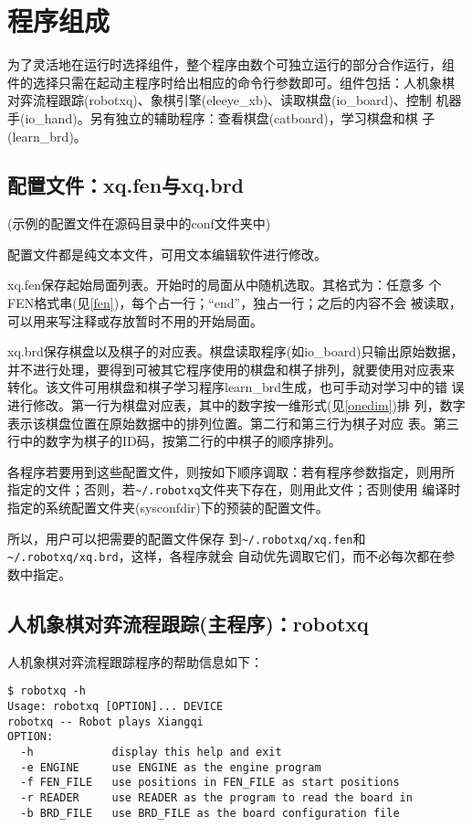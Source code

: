 \documentclass[a4paper]{article}
\begin{document}
\section{程序组成}
为了灵活地在运行时选择组件，整个程序由数个可独立运行的部分合作运行，组
件的选择只需在起动主程序时给出相应的命令行参数即可。组件包括：人机象棋
对弈流程跟踪(robotxq)、象棋引擎(eleeye\_xb)、读取棋盘(io\_board)、控制
机器手(io\_hand)。另有独立的辅助程序：查看棋盘(catboard)，学习棋盘和棋
子(learn\_brd)。

\subsection{配置文件：xq.fen与xq.brd}
\label{conf}
(示例的配置文件在源码目录中的conf文件夹中)

配置文件都是纯文本文件，可用文本编辑软件进行修改。

xq.fen保存起始局面列表。开始时的局面从中随机选取。其格式为：任意多
个FEN格式串(见\ref{fen})，每个占一行；``end''，独占一行；之后的内容不会
被读取，可以用来写注释或存放暂时不用的开始局面。

xq.brd保存棋盘以及棋子的对应表。棋盘读取程序(如io\_board)只输出原始数据，
并不进行处理，要得到可被其它程序使用的棋盘和棋子排列，就要使用对应表来
转化。该文件可用棋盘和棋子学习程序learn\_brd生成，也可手动对学习中的错
误进行修改。第一行为棋盘对应表，其中的数字按一维形式(见\ref{onedim})排
列，数字表示该棋盘位置在原始数据中的排列位置。第二行和第三行为棋子对应
表。第三行中的数字为棋子的ID码，按第二行的中棋子的顺序排列。

各程序若要用到这些配置文件，则按如下顺序调取：若有程序参数指定，则用所
指定的文件；否则，若\verb|~/.robotxq|文件夹下存在，则用此文件；否则使用
编译时指定的系统配置文件夹(sysconfdir)下的预装的配置文件。

所以，用户可以把需要的配置文件保存
到\verb|~/.robotxq/xq.fen|和\verb|~/.robotxq/xq.brd|，这样，各程序就会
自动优先调取它们，而不必每次都在参数中指定。

\subsection{人机象棋对弈流程跟踪(主程序)：robotxq}
人机象棋对弈流程跟踪程序的帮助信息如下：
\begin{verbatim}
$ robotxq -h
Usage: robotxq [OPTION]... DEVICE
robotxq -- Robot plays Xiangqi
OPTION:
  -h            display this help and exit
  -e ENGINE     use ENGINE as the engine program
  -f FEN_FILE   use positions in FEN_FILE as start positions
  -r READER     use READER as the program to read the board in
  -b BRD_FILE   use BRD_FILE as the board configuration file
\end{verbatim}
\end{document}
